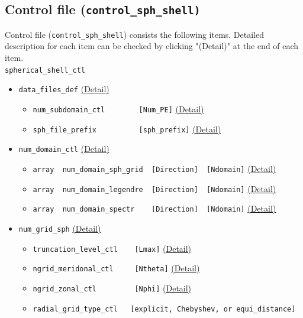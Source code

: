 \subsection{Control file (\tt{control\_sph\_shell})}
\label{section:control_sph_shell}
Control file ({\tt control\_sph\_shell}) consists the following items. Detailed description for each item can be checked by clicking "(Detail)" at the end of each item.
\\
%
\verb|spherical_shell_ctl|
\label{href_i:spherical_shell_ctl}
\\
%
\begin{itemize}
\item \verb|data_files_def|
	\label{href_i:data_files_def2}
	\hyperref[href_t:data_files_def]{(Detail)}
	\begin{itemize}
	\item \verb|num_subdomain_ctl        [Num_PE]|
		\hyperref[href_t:num_subdomain_ctl]{(Detail)}
	\item \verb|sph_file_prefix          [sph_prefix]|
    		\hyperref[href_t:sph_file_prefix]{(Detail)}
	\end{itemize}
%
\item \verb|num_domain_ctl|
	\label{href_i:num_domain_ctl}
	\hyperref[href_t:num_domain_ctl]{(Detail)}
	\begin{itemize}
	\item \verb|array  num_domain_sph_grid  [Direction]  [Ndomain]|
		\hyperref[href_t:num_domain_sph_grid]{(Detail)}
	\item \verb|array  num_domain_legendre  [Direction]  [Ndomain]|
	\hyperref[href_t:num_domain_legendre]{(Detail)}
	\item \verb|array  num_domain_spectr    [Direction]  [Ndomain]|
		\hyperref[href_t:num_domain_spectr]{(Detail)}
	\end{itemize}
%
\item \verb|num_grid_sph|
	\label{href_i:num_grid_sph}
	\hyperref[href_t:num_grid_sph]{(Detail)}
	\begin{itemize}
	\item \verb|truncation_level_ctl    [Lmax]|
		\hyperref[href_t:truncation_level_ctl]{(Detail)}
	\item \verb|ngrid_meridonal_ctl     [Ntheta]|
		\hyperref[href_t:ngrid_meridonal_ctl]{(Detail)}
	\item \verb|ngrid_zonal_ctl         [Nphi]|
		\hyperref[href_t:ngrid_zonal_ctl]{(Detail)}
%
	\item \verb|radial_grid_type_ctl   [explicit, Chebyshev, or equi_distance]| \label{href_i:radial_grid_type_ctl}

\end{itemize}
\end{itemize}
